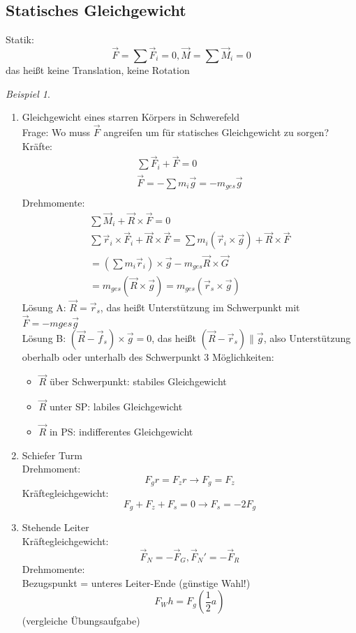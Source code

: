\documentclass[a4paper]{scrartcl}
\renewcommand{\v}[1]{\vec{#1}}
\theoremstyle{definition}
\theoremstyle{plain}
\theoremstyle{plain}
\theoremstyle{remark}
\theoremstyle{remark}
\theoremstyle{remark}
\newtheorem{ex}{Beispiel}
\begin{document}
\subsection{Statisches Gleichgewicht}
\label{sec-8-3}
Statik:
\[\v F = \sum \v F_i = 0, \v M = \sum \v M_i = 0\]
das heißt keine Translation, keine Rotation
\begin{ex}
\mbox{}
\begin{enumerate}
\item Gleichgewicht eines starren Körpers in Schwerefeld \\
         Frage: Wo muss $\v F$ angreifen um für statisches Gleichgewicht zu sorgen? \\
         Kräfte:
\begin{align*}
\sum \v F_i + \v F = 0 \\
\v F = - \sum m_i \v g = - m_{ges} \v g \\
\end{align*}
Drehmomente:
\begin{align*}
\sum \v M_i + \v R \times \v F = 0 \\
\sum \v r_i \times \v F_i + \v R \times \v F = \sum m_i (\v r_i \times \v g) + \v R \times \v F \\
= (\sum m_i \v r_i) \times \v g - m_{ges} \v R \times \v G \\
= m_{ges} (\v R \times \v g) = m_{ges} (\v r_s \times \v g)
\end{align*}
Lösung A: $\v R = \v r_s$, das heißt Unterstützung im Schwerpunkt mit $\v F = - m{ges} \v g$ \\
         Lösung B: $(\v R - \v f_s) \times \v g = 0$, das heißt $(\v R - \v r_s) \parallel \v g$, also Unterstützung oberhalb oder unterhalb des Schwerpunkt
3 Möglichkeiten:
\begin{itemize}
\item $\v R$ über Schwerpunkt: stabiles Gleichgewicht
\item $\v R$ unter SP: labiles Gleichgewicht
\item $\v R$ in PS: indifferentes Gleichgewicht
\end{itemize}
\item Schiefer Turm \\
          Drehmoment:
\[F_g r = F_z r \rightarrow F_g = F_z\]
Kräftegleichgewicht:
\[F_g + F_z + F_s = 0 \rightarrow F_s = -2F_g\]
\item Stehende Leiter \\
          Kräftegleichgewicht:
\[\v F_N = - \v F_G, \v F_N' = -\v F_R\]
Drehmomente: \\
          Bezugspunkt = unteres Leiter-Ende (günstige Wahl!) \\
          \[F_W h = F_g (\frac{1}{2} a)\]
(vergleiche Übungsaufgabe)
\end{enumerate}
\end{ex}
\end{document}
